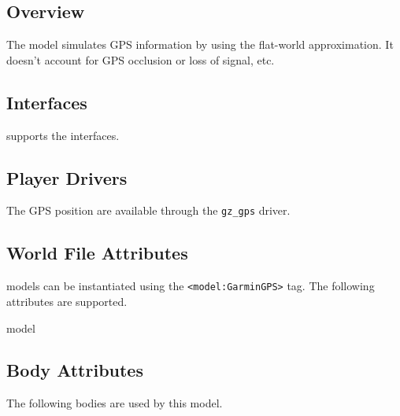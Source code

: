 
\subsection{Overview}

The {\tt \modelName} model simulates GPS information by using the
flat-world approximation.  It doesn't account for GPS occlusion or
loss of signal, etc.

\subsection{\libgazebo Interfaces}

{\tt \modelName} supports the  interfaces.

\subsection{Player Drivers}

The GPS position are available through the {\tt gz\_gps} driver. 

\subsection{World File Attributes}

{\tt \modelName} models can be instantiated using the
\verb+<model:GarminGPS>+ tag.  The following attributes are
supported.

\begin{xmlattrtable}{model}{\modelName}
\modeldefaults
{}
\end{xmlattrtable}

\subsection{Body Attributes}

The following bodies are used by this model.

\begin{bodyattrtable}
\bodydefaults
\end{bodyattrtable}

